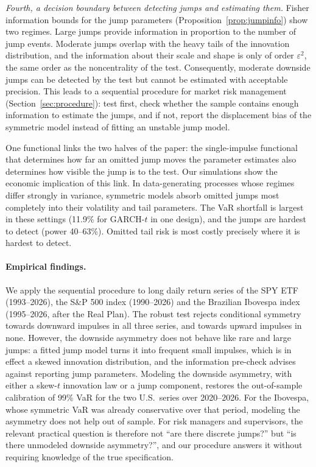 \documentclass[11pt,a4paper]{article}
\theoremstyle{definition}
\theoremstyle{remark}
\begin{document}
\emph{Fourth, a decision boundary between detecting jumps and estimating them.} Fisher information bounds for the jump parameters (Proposition~\ref{prop:jumpinfo}) show two regimes. Large jumps provide information in proportion to the number of jump events. Moderate jumps overlap with the heavy tails of the innovation distribution, and the information about their scale and shape is only of order $\varepsilon^2$, the same order as the noncentrality of the test. Consequently, moderate downside jumps can be detected by the test but cannot be estimated with acceptable precision. This leads to a sequential procedure for market risk management (Section~\ref{sec:procedure}): test first, check whether the sample contains enough information to estimate the jumps, and if not, report the displacement bias of the symmetric model instead of fitting an unstable jump model.

One functional links the two halves of the paper: the single-impulse functional that determines how far an omitted jump moves the parameter estimates also determines how visible the jump is to the test. Our simulations show the economic implication of this link. In data-generating processes whose regimes differ strongly in variance, symmetric models absorb omitted jumps most completely into their volatility and tail parameters. The VaR shortfall is largest in these settings (11.9\% for GARCH-$t$ in one design), and the jumps are hardest to detect (power 40--63\%). Omitted tail risk is most costly precisely where it is hardest to detect.

\paragraph{Empirical findings.} We apply the sequential procedure to long daily return series of the SPY ETF (1993--2026), the S\&P 500 index (1990--2026) and the Brazilian Ibovespa index (1995--2026, after the Real Plan). The robust test rejects conditional symmetry towards downward impulses in all three series, and towards upward impulses in none. However, the downside asymmetry does not behave like rare and large jumps: a fitted jump model turns it into frequent small impulses, which is in effect a skewed innovation distribution, and the information pre-check advises against reporting jump parameters. Modeling the downside asymmetry, with either a skew-$t$ innovation law or a jump component, restores the out-of-sample calibration of 99\% VaR for the two U.S.\ series over 2020--2026. For the Ibovespa, whose symmetric VaR was already conservative over that period, modeling the asymmetry does not help out of sample. For risk managers and supervisors, the relevant practical question is therefore not ``are there discrete jumps?'' but ``is there unmodeled downside asymmetry?'', and our procedure answers it without requiring knowledge of the true specification.
\end{document}
